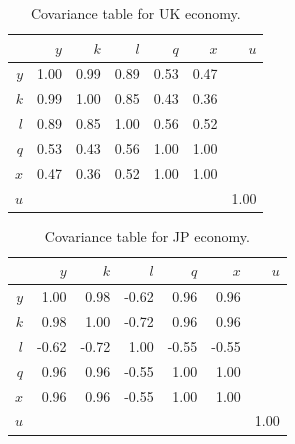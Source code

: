 \documentclass[preprint,authoryear,12pt]{elsarticle}\usepackage{graphicx, color}
\begin{document}
\begin{table}[H]
\begin{center}
\caption{Covariance table for  UK economy.}
\label{tab:Covar_UK}
\begin{tabular}{rrrrrrr}
  \hline
 & $y$ & $k$ & $l$ & $q$ & $x$ & $u$ \\ 
  \hline
$y$ & 1.00 & 0.99 & 0.89 & 0.53 & 0.47 &  \\ 
  $k$ & 0.99 & 1.00 & 0.85 & 0.43 & 0.36 &  \\ 
  $l$ & 0.89 & 0.85 & 1.00 & 0.56 & 0.52 &  \\ 
  $q$ & 0.53 & 0.43 & 0.56 & 1.00 & 1.00 &  \\ 
  $x$ & 0.47 & 0.36 & 0.52 & 1.00 & 1.00 &  \\ 
  $u$ &  &  &  &  &  & 1.00 \\ 
   \hline
\end{tabular}
\end{center}
\end{table}



\begin{table}[H]
\begin{center}
\caption{Covariance table for  JP economy.}
\label{tab:Covar_JP}
\begin{tabular}{rrrrrrr}
  \hline
 & $y$ & $k$ & $l$ & $q$ & $x$ & $u$ \\ 
  \hline
$y$ & 1.00 & 0.98 & -0.62 & 0.96 & 0.96 &  \\ 
  $k$ & 0.98 & 1.00 & -0.72 & 0.96 & 0.96 &  \\ 
  $l$ & -0.62 & -0.72 & 1.00 & -0.55 & -0.55 &  \\ 
  $q$ & 0.96 & 0.96 & -0.55 & 1.00 & 1.00 &  \\ 
  $x$ & 0.96 & 0.96 & -0.55 & 1.00 & 1.00 &  \\ 
  $u$ &  &  &  &  &  & 1.00 \\ 
   \hline
\end{tabular}
\end{center}
\end{table}
\end{document}
